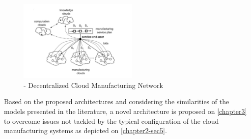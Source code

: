 \begin{figure}[h]
    \centering
    \includegraphics[height=4cm, keepaspectratio]{images/skulj-cmdna}
    \caption{\textcite{skulj_decentralised_2015} - Decentralized Cloud Manufacturing Network}
    \label{fig:skulj-cmdna}
\end{figure}

Based on the proposed architectures and considering the similarities of the models presented in the literature, a novel architecture is proposed on \autoref{chapter3} to overcome issues not tackled by the typical configuration of the cloud manufacturing systems as depicted on \autoref{chapter2-sec5}.

